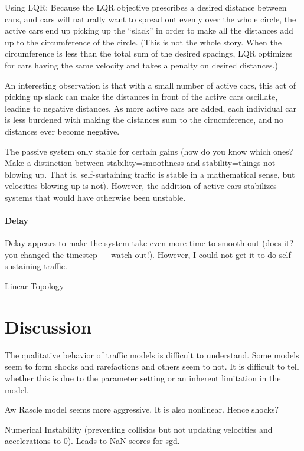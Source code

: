 \documentclass[10pt]{article}
\begin{document}
\begin{multicols}{2}
Using LQR: Because the LQR objective prescribes a desired distance between cars, and cars will naturally want to spread out evenly over the whole circle, the active cars end up picking up the ``slack'' in order to make all the distances add up to the circumference of the circle. (This is not the whole story. When the circumference is less than the total sum of the desired spacings, LQR optimizes for cars having the same velocity and takes a penalty on desired distances.)

An interesting observation is that with a small number of active cars, this act of picking up slack can make the distances in front of the active cars oscillate, leading to negative distances. As more active cars are added, each individual car is less burdened with making the distances sum to the cirucmference, and no distances ever become negative.

The passive system only stable for certain gains (how do you know which ones? Make a distinction between stability=smoothness and stability=things not blowing up. That is, self-sustaining traffic is stable in a mathematical sense, but velocities blowing up is not). However, the addition of active cars stabilizes systems that would have otherwise been unstable.

\paragraph{Delay}

Delay appears to make the system take even more time to smooth out (does it? you changed the timestep --- watch out!). However, I could not get it to do self sustaining traffic.



Linear Topology


\section{Discussion}  

The qualitative behavior of traffic models is difficult to understand. Some models seem to form shocks and rarefactions and others seem to not. It is difficult to tell whether this is due to the parameter setting or an inherent limitation in the model.

Aw Rascle model seems more aggressive. It is also nonlinear. Hence shocks?

Numerical Instability (preventing collisios but not updating velocities and accelerations to 0). Leads to NaN scores for sgd.


\end{multicols}
\end{document}
